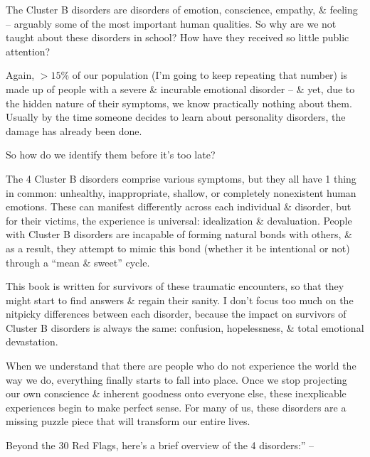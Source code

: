\documentclass{article}
\numberwithin{equation}{section}
\begin{document}
The Cluster B disorders are disorders of emotion, conscience, empathy, \& feeling -- arguably some of the most important human qualities. So why are we not taught about these disorders in school? How have they received so little public attention?

Again, $> 15\%$ of our population (I'm going to keep repeating that number) is made up of people with a severe \& incurable emotional disorder -- \& yet, due to the hidden nature of their symptoms, we know practically nothing about them. Usually by the time someone decides to learn about personality disorders, the damage has already been done.

So how do we identify them before it's too late?

The 4 Cluster B disorders comprise various symptoms, but they all have 1 thing in common: unhealthy, inappropriate, shallow, or completely nonexistent human emotions. These can manifest differently across each individual \& disorder, but for their victims, the experience is universal: idealization \& devaluation. People with Cluster B disorders are incapable of forming natural bonds with others, \& as a result, they attempt to mimic this bond (whether it be intentional or not) through a ``mean \& sweet'' cycle.

This book is written for survivors of these traumatic encounters, so that they might start to find answers \& regain their sanity. I don't focus too much on the nitpicky differences between each disorder, because the impact on survivors of Cluster B disorders is always the same: confusion, hopelessness, \& total emotional devastation.

When we understand that there are people who do not experience the world the way we do, everything finally starts to fall into place. Once we stop projecting our own conscience \& inherent goodness onto everyone else, these inexplicable experiences begin to make perfect sense. For many of us, these disorders are a missing puzzle piece that will transform our entire lives.

Beyond the 30 Red Flags, here's a brief overview of the 4 disorders:'' -- \cite[pp. 191--193]{MacKenzie2015}
\end{document}
